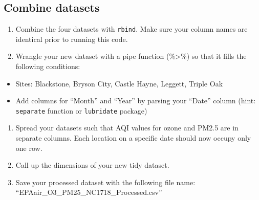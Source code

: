 \documentclass[]{article}
\providecommand{\tightlist}{%
  \setlength{\itemsep}{0pt}\setlength{\parskip}{0pt}}
\begin{document}
\subsection{Combine datasets}\label{combine-datasets}

\begin{enumerate}
\def\labelenumi{\arabic{enumi}.}
\setcounter{enumi}{6}
\tightlist
\item
  Combine the four datasets with \texttt{rbind}. Make sure your column
  names are identical prior to running this code.
\item
  Wrangle your new dataset with a pipe function (\%\textgreater{}\%) so
  that it fills the following conditions:
\end{enumerate}

\begin{itemize}
\tightlist
\item
  Sites: Blackstone, Bryson City, Castle Hayne, Leggett, Triple Oak
\item
  Add columns for ``Month'' and ``Year'' by parsing your ``Date'' column
  (hint: \texttt{separate} function or \texttt{lubridate} package)
\end{itemize}

\begin{enumerate}
\def\labelenumi{\arabic{enumi}.}
\setcounter{enumi}{8}
\item
  Spread your datasets such that AQI values for ozone and PM2.5 are in
  separate columns. Each location on a specific date should now occupy
  only one row.
\item
  Call up the dimensions of your new tidy dataset.
\item
  Save your processed dataset with the following file name:
  ``EPAair\_O3\_PM25\_NC1718\_Processed.csv''
\end{enumerate}
\end{document}
